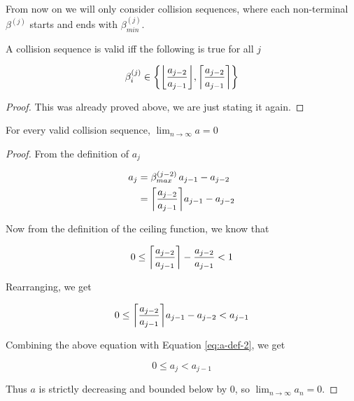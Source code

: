 From now on we will only consider collision sequences, where each non-terminal $\beta^{(j)}$ starts and ends with $\beta^{(j)}_{min}$.


\begin{theorem}\label{thm:beta_i}
	A collision sequence is valid iff the following is true for all $j$

	\begin{equation}
		\beta^{(j)}_i \in \cbracket{\floor{\frac{a_{j-2}}{a_{j-1}}}, \ceil{\frac{a_{j-2}}{a_{j-1}}}}
	\end{equation}
\end{theorem}

\begin{proof}
	This was already proved above, we are just stating it again.
\end{proof}


\begin{theorem}
	For every valid collision sequence, $\lim_{n \to \infty} a = 0$
\end{theorem}

\begin{proof}
	From the definition of $a_j$

	\begin{align}\label{eq:a-def-2}
		a_j& = \beta^{(j-2)}_{max} \, a_{j-1} - a_{j-2}\\
		& =  \ceil{\frac{a_{j-2}}{a_{j-1}}} a_{j-1} - a_{j-2}
	\end{align}

	Now from the definition of the ceiling function, we know that

	\begin{equation}
		0 \le \ceil{\frac{a_{j-2}}{a_{j-1}}} - \frac{a_{j-2}}{a_{j-1}} < 1
	\end{equation}

	Rearranging, we get

	\begin{equation}
		0 \le \ceil{\frac{a_{j-2}}{a_{j-1}}} a_{j-1} - a_{j-2} < a_{j-1}
	\end{equation}

	Combining the above equation with Equation \ref{eq:a-def-2}, we get

	\begin{equation}
		0 \le a_j < a_{j-1}
	\end{equation}

	Thus $a$ is strictly decreasing and bounded below by 0, so $\lim_{n \to \infty} a_n = 0$.
\end{proof}
